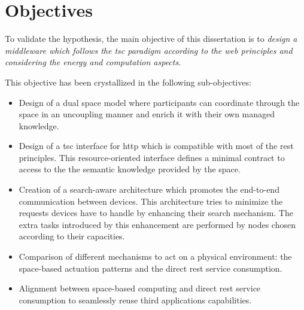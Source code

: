 \section{Objectives}

To validate the hypothesis, the main objective of this dissertation is to
\emph{design a middleware which follows the \ac{tsc} paradigm according to the web principles and considering the energy and computation aspects}.

This objective has been crystallized in the following sub-objectives:

\begin{itemize} %
  \item Design of a dual space model where participants can coordinate through the space in an uncoupling manner and enrich it with their own managed knowledge.
  \item Design of a \ac{tsc} interface for \ac{http} which is compatible with most of the \ac{rest} principles.
	This resource-oriented interface defines a minimal contract to access to the the semantic knowledge provided by the space. %
  \item Creation of a search-aware architecture which promotes the end-to-end communication between devices. %
	This architecture tries to minimize the requests devices have to handle by enhancing their search mechanism.
	The extra tasks introduced by this enhancement are performed by nodes chosen according to their capacities.
  \item Comparison of different mechanisms to act on a physical environment: the space-based actuation patterns and the direct \ac{rest} service consumption.
  \item Alignment between space-based computing and direct \ac{rest} service consumption to seamlessly reuse third applications capabilities.
\end{itemize}